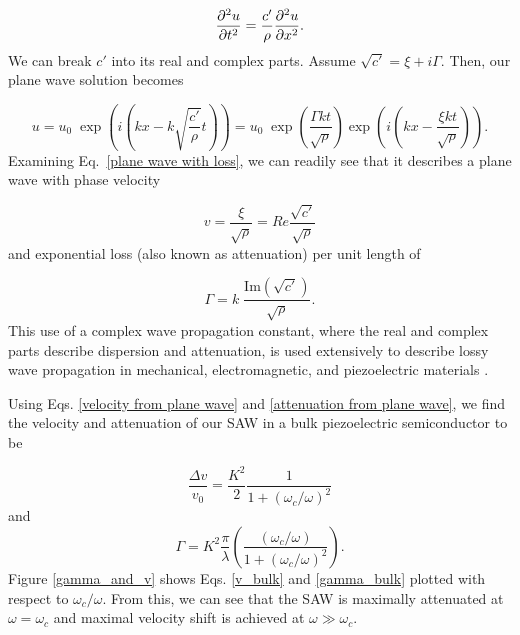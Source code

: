 \documentclass[double,12pt,1in,seploa]{beavtex}
\begin{document}
\begin{equation}
    \pdv[2]{u}{t} = \frac{c'}{\rho} \pdv[2]{u}{x}.
\end{equation}
We can break $c'$ into its real and complex parts. Assume $\sqrt{c'} = \xi + i\Gamma$. Then, our plane wave solution becomes

\begin{equation}
    u = u_0 \; \exp\left(i(kx-k\sqrt{\frac{c'}{\rho}}t)\right)
    = u_0 \; \exp\left(\frac{\Gamma k t}{\sqrt{\rho}}\right) \exp\left(i(kx - \frac{\xi kt}{\sqrt{\rho}})\right). \label{plane wave with loss}
\end{equation}
Examining Eq.\ \ref{plane wave with loss}, we can readily see that it describes a plane wave with phase velocity 

\begin{equation}
    v = \frac{\xi}{\sqrt{\rho}} = Re{\frac{\sqrt{c'}}{\sqrt{\rho}}} \label{velocity from plane wave}
\end{equation} 
and exponential loss (also known as attenuation) per unit length of 

\begin{equation}
    \Gamma = k \; \frac{\mathrm{Im}(\sqrt{c'})}{\sqrt{\rho}}. \label{attenuation from plane wave}
\end{equation} 
This use of a complex wave propagation constant, where the real and complex parts describe dispersion and attenuation, is used extensively to describe lossy wave propagation in mechanical, electromagnetic, and piezoelectric materials \cite{holland_representation_1967} \cite[p.\ 18]{pozar_microwave_2012} \cite{weinreich_acoustodynamic_1956, gonzalez_revisiting_2016}. 

Using Eqs. \ref{velocity from plane wave} and \ref{attenuation from plane wave}, we find the velocity and attenuation of our SAW in a bulk piezoelectric semiconductor to be

\begin{equation}
    \frac{\Delta v}{v_0} = \frac{K^2}{2}\frac{1}{1+(\omega_c/\omega)^2} \label{v_bulk}
\end{equation}
and
\begin{equation}
    \Gamma = K^2 \frac{\pi}{\lambda}\left(\frac{(\omega_c/\omega)}{1+(\omega_c/\omega)^2}\right). \label{gamma_bulk}
\end{equation}
Figure \ref{gamma_and_v} shows Eqs. \ref{v_bulk} and \ref{gamma_bulk} plotted with respect to  $\omega_c/\omega$. From this, we can see that the SAW is maximally attenuated at $\omega = \omega_c$ and maximal velocity shift is achieved at $\omega \gg \omega_c$.
\end{document}
